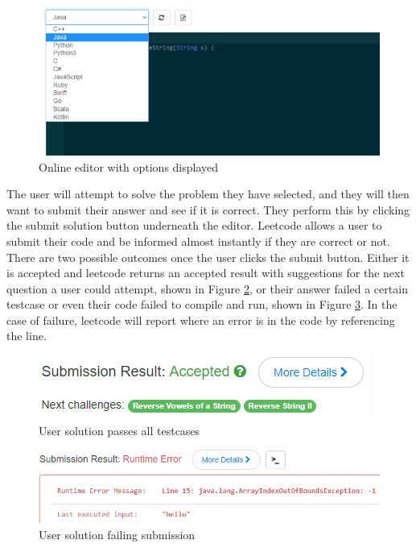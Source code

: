 \documentclass[10pt,twocolumn,hidelinks]{IEEEtran}
\begin{document}
\begin{figure}[h]
\includegraphics[scale=0.4]{languageUI.png}
\caption{Online editor with options displayed}
\label{fig:langUI}
\end{figure}   
The user will attempt to solve the problem they have selected, and they will then want to submit their answer and see if it is correct. They perform this by clicking the submit solution button underneath the editor. Leetcode allows a user to submit their code and be informed almost instantly if they are correct or not. There are two possible outcomes once the user clicks the submit button. Either it is accepted and leetcode returns an accepted result with suggestions for the next question a user could attempt, shown in Figure \ref{fig:accepted}, or their answer failed a certain testcase or even their code failed to compile and run, shown in Figure \ref{fig:fail}. In the case of failure, leetcode will report where an error is in the code by referencing the line.  
\begin{figure}[h]
\includegraphics[scale=0.4]{accepted.png}
\caption{User solution passes all testcases}
\label{fig:accepted}
\end{figure}  
\begin{figure}[h]
\includegraphics[scale=0.4]{failure.png}
\caption{User solution failing submission}
\label{fig:fail}
\end{figure}    
\end{document}
